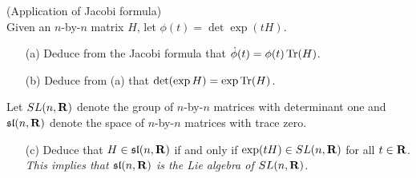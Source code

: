 \documentclass[12pt]{article}
\begin{document}
\iffalse
\begin{answer}
\begin{enumerate}[(a)]
\item We have
\begin{align*}
\det(1+\epsilon H)&=\det\MATR{1+\epsilon H_{11}}{\epsilon H_{12}}{\epsilon H_{1n}}{\epsilon H_{21}}{1+\epsilon H_{22}}{\epsilon H_{2n}}{\epsilon H_{n1}}{\epsilon H_{n2}}{1+\epsilon H_{nn}}\\
&=(1+\epsilon H_{11})(1+\epsilon H_{22})\cdots(1+\epsilon H_{nn})+\mathcal{O}(\epsilon^2)
\end{align*}
where the product comes from the diagonal terms and all other products contributing to the determinant involve at least two off-diagonal terms and hence have a factor of $\epsilon^2$. This expands to
\[\det(1+\epsilon H)=1+\epsilon\sum H_{ii}+\mathcal{O}(\epsilon^2)\]
and $\OP{Tr}(H)=\sum H_{ii}$.
\item We have $\det(A+\epsilon H)=\det(A(1+\epsilon A^{-1}H))=\det(A)\det(1+\epsilon A^{-1}H)$ so $\det(A+\epsilon H)=\det(A)+\epsilon\det(A)\OP{Tr}(A^{-1}H)+\mathcal{O}(\epsilon^2)$ by part (a).
\item If $A(t)$ is a path of matrices then $\det(A(t+\epsilon))=\det(A(t)+\epsilon\dot{A}(t)+\mathcal{O}(\epsilon^2))=\det(A(t))+\epsilon\det(A)\OP{Tr}(A^{-1}(t)\dot{A}(t))+\mathcal{O}(\epsilon^2)$. Since the derivative is just the first order part of the Taylor series we have Jacobi's formula
\[\frac{d}{dt}\det(A(t))=\det(A)\OP{Tr}(A^{-1}(t)\dot{A}(t)).\]
\end{enumerate}
\end{answer}
\newpage
\fi

\bigskip

\begin{question}(Application of Jacobi formula)\\
Given an $n$-by-$n$ matrix $H$, let $\phi(t)=\det\exp(tH)$.
\begin{enumerate}
\item[(a)] Deduce from the Jacobi formula that $\dot{\phi}(t)=\phi(t)\operatorname{Tr}(H)$.
\item[(b)] Deduce from (a) that $\det(\exp H)=\exp\operatorname{Tr}(H)$.
\end{enumerate}
Let $SL(n,\mathbf{R})$ denote the group of $n$-by-$n$ matrices with determinant one and $\mathfrak{sl}(n,\mathbf{R})$ denote the space of $n$-by-$n$ matrices with trace zero.
\begin{enumerate}
\item[(c)] Deduce that $H\in\mathfrak{sl}(n,\mathbf{R})$ if and only if $\exp(tH)\in SL(n,\mathbf{R})$ for all $t\in\mathbf{R}$. {\em This implies that $\mathfrak{sl}(n,\mathbf{R})$ is the Lie algebra of $SL(n,\mathbf{R})$.}
\end{enumerate}
\end{question}
\end{document}
